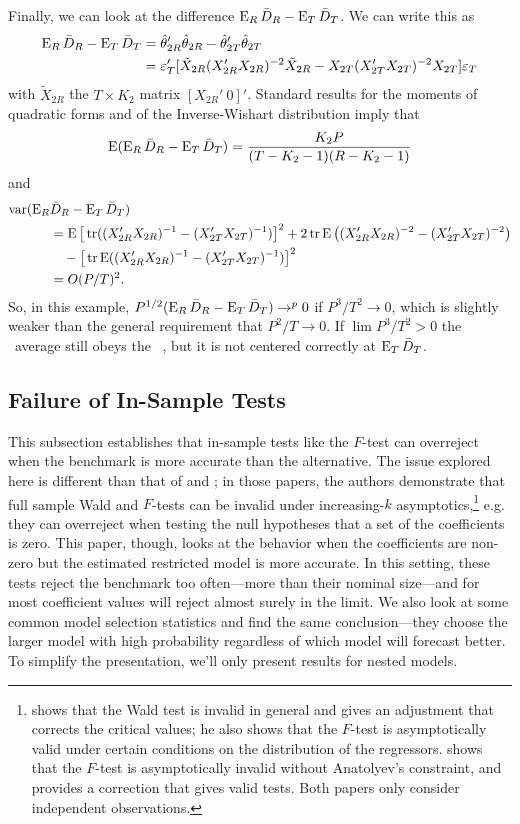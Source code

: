 \documentclass[11pt]{article}
\newcommand{\e}{\varepsilon}
\newcommand{\eb}{\mathbf{\e}}
\begin{document}
Finally, we can look at the difference $\operatorname{E}_R \bar{D}_R - \operatorname{E}_T
\bar{D}_T$.  We can write this as
\begin{align*}
  \E_R \oosA - \E_T \oosB &= \hat{\theta}_{2R}'
  \hat{\theta}_{2R} - \hat{\theta}_{2T}' \hat{\theta}_{2T} \\ &=
  \eb_T'[\tilde{X}_{2R}(X_{2R}'X_{2R})^{-2}
  \tilde{X}_{2R} - X_{2T}(X_{2T}'X_{2T})^{-2} X_{2T} ] \eb_T
\end{align*}
with $\tilde{X}_{2R}$ the $T \times K_2$ matrix $[X_{2R}'\ 0]'$.
Standard results for the moments of quadratic forms and of the
Inverse-Wishart distribution \citep{Haf:79} imply that
\begin{equation*}
  \operatorname{E}(\operatorname{E}_R \bar{D}_{R} - \operatorname{E}_T \bar{D}_{T}) = \frac{K_2 P}{(T - K_2 - 1)(R - K_2 - 1)}
\end{equation*}
and
\begin{align*}
  \operatorname{var}(\operatorname{E}_R & \bar{D}_{R} - \operatorname{E}_T \bar{D}_{T}) \\ &= \operatorname{E}
  \big[\operatorname{tr}((X_{2R}'X_{2R})^{-1} - (X_{2T}'X_{2T})^{-1})\big]^2 + 2 \operatorname{tr}
  \operatorname{E}\big((X_{2R}'X_{2R})^{-2} - (X_{2T}'X_{2T})^{-2}\big) \\ &\quad - \big[\operatorname{tr}
  \operatorname{E}((X_{2R}'X_{2R})^{-1} - (X_{2T}'X_{2T})^{-1}) \big]^2 \\ &=
  O(P/T)^2.
\end{align*}
So, in this example, $P^{1/2}(\operatorname{E}_R \bar{D}_{R} - \operatorname{E}_T \bar{D}_{T}) \to^p 0$
if $P^3/T^2 \to 0$, which is slightly weaker than the general
requirement that $P^2/T \to 0$.  If $\lim P^3/T^2 > 0$ the \oos\ average
still obeys the \mds\ \clt, but it is not centered correctly at $\operatorname{E}_T
\bar{D}_{T}$.

\subsection{Failure of In-Sample Tests}\label{sec:insample}
This subsection establishes that in-sample tests like the $F$-test can
overreject when the benchmark is more accurate than the alternative.
The issue explored here is different than that of \citet{Cal:11c} and
\citet{Ana:12}; in those papers, the authors demonstrate that full
sample Wald and $F$-tests can be invalid under increasing-$k$
asymptotics,\footnote{\citet{Ana:12} shows that the Wald test is
  invalid in general and gives an adjustment that corrects the
  critical values; he also shows that the $F$-test is asymptotically
  valid under certain conditions on the distribution of the
  regressors.  \citet{Cal:11c} shows that the $F$-test is
  asymptotically invalid without Anatolyev's constraint, and provides
  a correction that gives valid tests.  Both papers only consider
  independent observations.} e.g. they can overreject when testing the
null hypotheses that a set of the coefficients is zero.  This paper,
though, looks at the behavior when the coefficients are non-zero but
the estimated restricted model is more accurate.  In this setting,
these tests reject the benchmark too often---more than their nominal
size---and for most coefficient values will reject almost surely in
the limit.  We also look at some common model selection statistics and
find the same conclusion---they choose the larger model with high
probability regardless of which model will forecast better.  To
simplify the presentation, we'll only present results for nested
models.
\end{document}
